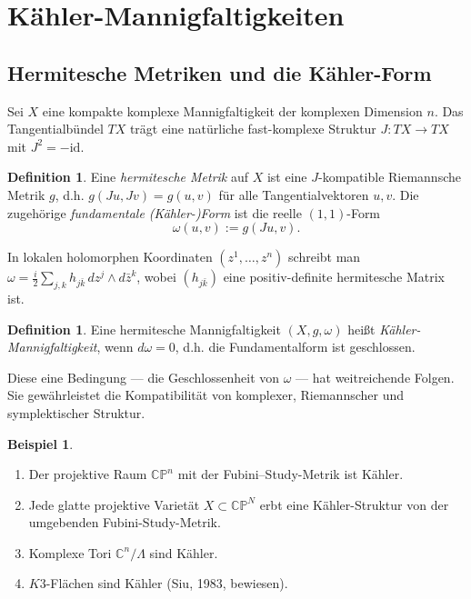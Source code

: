 \documentclass[12pt,a4paper]{amsart}
\theoremstyle{definition}
\newtheorem{definition}[theorem]{Definition}
\newtheorem{beispiel}[theorem]{Beispiel}
\theoremstyle{remark}
\begin{document}
\section{Kähler-Mannigfaltigkeiten}
\label{sec:kaehler}

\subsection{Hermitesche Metriken und die Kähler-Form}

Sei $X$ eine kompakte komplexe Mannigfaltigkeit der komplexen Dimension $n$. Das
Tangentialbündel $TX$ trägt eine natürliche fast-komplexe Struktur $J: TX \to TX$
mit $J^2 = -\mathrm{id}$.

\begin{definition}
Eine \emph{hermitesche Metrik} auf $X$ ist eine $J$-kompatible Riemannsche Metrik
$g$, d.h. $g(Ju, Jv) = g(u,v)$ für alle Tangentialvektoren $u,v$. Die zugehörige
\emph{fundamentale (Kähler-)Form} ist die reelle $(1,1)$-Form
\[
  \omega(u,v) := g(Ju, v).
\]
\end{definition}

In lokalen holomorphen Koordinaten $(z^1, \ldots, z^n)$ schreibt man
$\omega = \frac{i}{2}\sum_{j,k} h_{j\bar k}\, dz^j \wedge d\bar z^k$,
wobei $(h_{j\bar k})$ eine positiv-definite hermitesche Matrix ist.

\begin{definition}
Eine hermitesche Mannigfaltigkeit $(X, g, \omega)$ heißt \emph{Kähler-Mannigfaltigkeit},
wenn $d\omega = 0$, d.h. die Fundamentalform ist geschlossen.
\end{definition}

Diese eine Bedingung — die Geschlossenheit von $\omega$ — hat weitreichende Folgen.
Sie gewährleistet die Kompatibilität von komplexer, Riemannscher und symplektischer
Struktur.

\begin{beispiel}
\begin{enumerate}[label=(\alph*)]
\item Der projektive Raum $\mathbb{CP}^n$ mit der Fubini–Study-Metrik ist Kähler.
\item Jede glatte projektive Varietät $X \subset \mathbb{CP}^N$ erbt eine Kähler-Struktur
  von der umgebenden Fubini-Study-Metrik.
\item Komplexe Tori $\mathbb{C}^n / \Lambda$ sind Kähler.
\item $K3$-Flächen sind Kähler (Siu, 1983, bewiesen).
\end{enumerate}
\end{beispiel}
\end{document}
